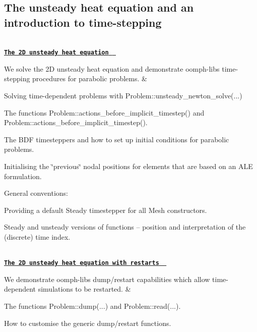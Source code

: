 \begin{longtabu}
{\subsection*{The unsteady heat equation and an introduction to time-\/stepping}

}\\
\href{../../unsteady_heat/two_d_unsteady_heat/html/index.html}{\tt {\bfseries  The 2D unsteady heat equation } }

We solve the 2D unsteady heat equation and demonstrate {\ttfamily oomph-\/lib\textquotesingle{}s} time-\/stepping procedures for parabolic problems.  &
\begin{DoxyItemize}
\item Solving time-\/dependent problems with {\ttfamily Problem\+::unsteady\+\_\+newton\+\_\+solve}(...)
\item The functions {\ttfamily Problem\+::actions\+\_\+before\+\_\+implicit\+\_\+timestep()} and {\ttfamily Problem\+::actions\+\_\+before\+\_\+implicit\+\_\+timestep()}.
\item The B\+DF timesteppers and how to set up initial conditions for parabolic problems.
\item Initialising the \char`\"{}previous\char`\"{} nodal positions for elements that are based on an A\+LE formulation.
\item General conventions\+:
\begin{DoxyItemize}
\item Providing a default {\ttfamily Steady} timestepper for all {\ttfamily Mesh} constructors.
\item Steady and unsteady versions of functions -- position and interpretation of the (discrete) time index. 
\end{DoxyItemize}
\end{DoxyItemize}

\\
\href{../../unsteady_heat/two_d_unsteady_heat2/html/index.html}{\tt {\bfseries  The 2D unsteady heat equation with restarts } }

We demonstrate {\ttfamily oomph-\/lib\textquotesingle{}s} dump/restart capabilities which allow time-\/dependent simulations to be restarted.  &
\begin{DoxyItemize}
\item The functions {\ttfamily Problem\+::dump}(...) and {\ttfamily Problem\+::read}(...).
\item How to customise the generic dump/restart functions. 
\end{DoxyItemize}


\end{longtabu}
